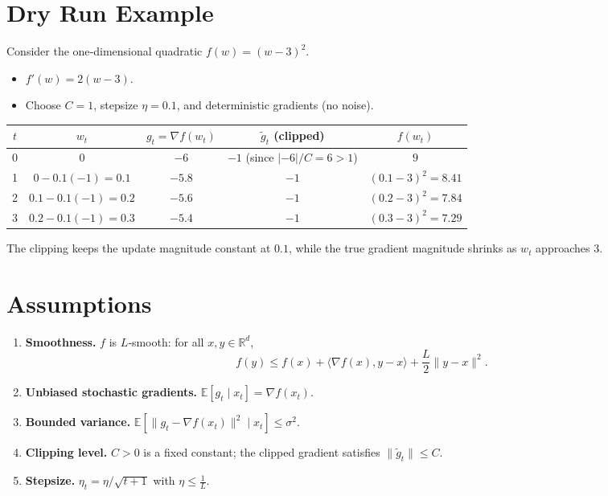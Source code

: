 \documentclass{article}
\newcommand{\E}{\mathbb{E}}
\newcommand{\R}{\mathbb{R}}
\begin{document}
\section*{Dry Run Example}
Consider the one‑dimensional quadratic $f(w)=(w-3)^2$.
\begin{itemize}
    \item $f'(w)=2(w-3)$.
    \item Choose $C=1$, stepsize $\eta=0.1$, and deterministic gradients (no noise).
\end{itemize}
\begin{center}
\begin{tabular}{c|c|c|c|c}
$t$ & $w_t$ & $g_t=\nabla f(w_t)$ & $\tilde g_t$ (clipped) & $f(w_t)$\\ \hline
0 & $0$ & $-6$ & $-1$ (since $|-6|/C=6>1$) & $9$\\
1 & $0-0.1(-1)=0.1$ & $-5.8$ & $-1$ & $(0.1-3)^2=8.41$\\
2 & $0.1-0.1(-1)=0.2$ & $-5.6$ & $-1$ & $(0.2-3)^2=7.84$\\
3 & $0.2-0.1(-1)=0.3$ & $-5.4$ & $-1$ & $(0.3-3)^2=7.29$
\end{tabular}
\end{center}
The clipping keeps the update magnitude constant at $0.1$, while the true gradient magnitude shrinks as $w_t$ approaches $3$.

\newpage

\section*{Assumptions}
\begin{enumerate}[label=(A\arabic*)]
\item \textbf{Smoothness.} $f$ is $L$‑smooth: for all $x,y\in\R^{d}$,
\[
f(y)\le f(x)+\langle\nabla f(x),y-x\rangle+\frac{L}{2}\|y-x\|^{2}.
\tag{A1}
\]
\item \textbf{Unbiased stochastic gradients.} $\E[g_t\mid x_t]=\nabla f(x_t)$.
\item \textbf{Bounded variance.} $\E[\|g_t-\nabla f(x_t)\|^{2}\mid x_t]\le\sigma^{2}$.
\item \textbf{Clipping level.} $C>0$ is a fixed constant; the clipped gradient satisfies $\|\tilde g_t\|\le C$.
\item \textbf{Stepsize.} $\eta_t=\eta/\sqrt{t+1}$ with $\eta\le \frac{1}{L}$.
\end{enumerate}
\end{document}
